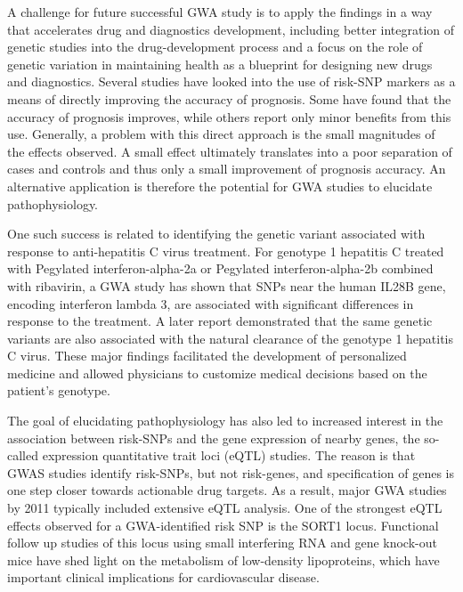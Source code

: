 A challenge for future successful GWA study is to apply the findings in a way that accelerates drug and diagnostics development, including better integration of genetic studies into the drug-development process and a focus on the role of genetic variation in maintaining health as a blueprint for designing new drugs and diagnostics. Several studies have looked into the use of risk-SNP markers as a means of directly improving the accuracy of prognosis. Some have found that the accuracy of prognosis improves, while others report only minor benefits from this use. Generally, a problem with this direct approach is the small magnitudes of the effects observed. A small effect ultimately translates into a poor separation of cases and controls and thus only a small improvement of prognosis accuracy. An alternative application is therefore the potential for GWA studies to elucidate pathophysiology.

One such success is related to identifying the genetic variant associated with response to anti-hepatitis C virus treatment. For genotype 1 hepatitis C treated with Pegylated interferon-alpha-2a or Pegylated interferon-alpha-2b combined with ribavirin, a GWA study has shown that SNPs near the human IL28B gene, encoding interferon lambda 3, are associated with significant differences in response to the treatment. A later report demonstrated that the same genetic variants are also associated with the natural clearance of the genotype 1 hepatitis C virus. These major findings facilitated the development of personalized medicine and allowed physicians to customize medical decisions based on the patient's genotype.

The goal of elucidating pathophysiology has also led to increased interest in the association between risk-SNPs and the gene expression of nearby genes, the so-called expression quantitative trait loci (eQTL) studies. The reason is that GWAS studies identify risk-SNPs, but not risk-genes, and specification of genes is one step closer towards actionable drug targets. As a result, major GWA studies by 2011 typically included extensive eQTL analysis. One of the strongest eQTL effects observed for a GWA-identified risk SNP is the SORT1 locus. Functional follow up studies of this locus using small interfering RNA and gene knock-out mice have shed light on the metabolism of low-density lipoproteins, which have important clinical implications for cardiovascular disease.

